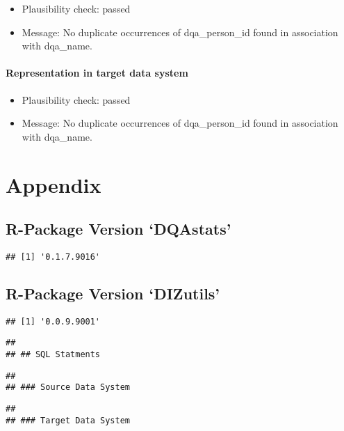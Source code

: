 \documentclass[
]{article}
\providecommand{\tightlist}{%
  \setlength{\itemsep}{0pt}\setlength{\parskip}{0pt}}
\begin{document}
\begin{itemize}
\tightlist
\item
  Plausibility check: passed
\item
  Message: No duplicate occurrences of dqa\_person\_id found in
  association with dqa\_name.
\end{itemize}

\hypertarget{representation-in-target-data-system-13}{%
\paragraph{Representation in target data
system}\label{representation-in-target-data-system-13}}

\begin{itemize}
\tightlist
\item
  Plausibility check: passed
\item
  Message: No duplicate occurrences of dqa\_person\_id found in
  association with dqa\_name.
\end{itemize}

\newpage

\hypertarget{appendix}{%
\section{Appendix}\label{appendix}}

\hypertarget{r-package-version-dqastats}{%
\subsection{R-Package Version
`DQAstats'}\label{r-package-version-dqastats}}

\begin{verbatim}
## [1] '0.1.7.9016'
\end{verbatim}

\hypertarget{r-package-version-dizutils}{%
\subsection{R-Package Version
`DIZutils'}\label{r-package-version-dizutils}}

\begin{verbatim}
## [1] '0.0.9.9001'
\end{verbatim}

\begin{verbatim}
## 
## ## SQL Statments
\end{verbatim}

\begin{verbatim}
## 
## ### Source Data System
\end{verbatim}

\begin{verbatim}
## 
## ### Target Data System
\end{verbatim}
\end{document}
